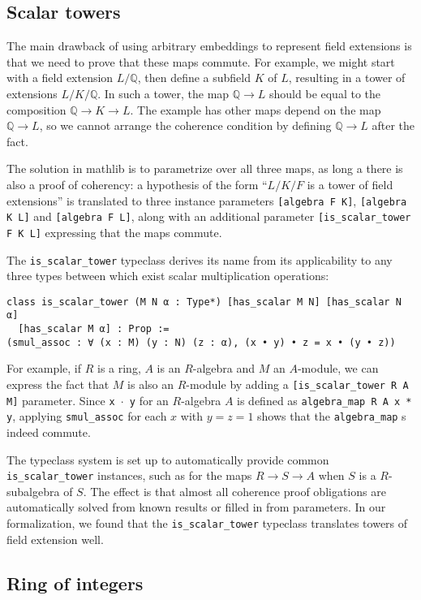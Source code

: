 \documentclass[a4paper,USenglish,cleveref, autoref, thm-restate]{lipics-v2021}
\newcommand{\lean}[1]{\texttt{#1}\xspace} %
\newcommand{\mathlib}{\textsf{mathlib}\xspace}
\newcommand{\Q}{\mathbb{Q}}
\begin{document}
\subsection{Scalar towers} \label{sec:scalar_tower}

The main drawback of using arbitrary embeddings to represent field extensions is that we need to prove that these maps commute.
For example, we might start with a field extension $L / \Q$, then define a subfield $K$ of $L$,
resulting in a tower of extensions $L / K / \Q$.
In such a tower, the map $\Q \to L$ should be equal to the composition $\Q \to K \to L$.
The example has other maps depend on the map $\Q \to L$, so we cannot arrange the coherence condition by defining $\Q \to L$ after the fact.

The solution in \mathlib is to parametrize over all three maps, as long a there is also a proof of coherency:
a hypothesis of the form ``$L / K / F$ is a tower of field extensions'' is translated to three instance parameters \lean{[algebra F K]}, \lean{[algebra K L]} and \lean{[algebra F L]},
along with an additional parameter \lean{[is\_scalar\_tower F K L]} expressing that the maps commute.

The \lean{is\_scalar\_tower} typeclass derives its name from its applicability to any three types between which exist scalar multiplication operations:
\begin{lstlisting}
class is_scalar_tower (M N α : Type*) [has_scalar M N] [has_scalar N α]
  [has_scalar M α] : Prop :=
(smul_assoc : ∀ (x : M) (y : N) (z : α), (x • y) • z = x • (y • z))
\end{lstlisting}
For example, if $R$ is a ring, $A$ is an $R$-algebra and $M$ an $A$-module, we can express the fact that $M$ is also an $R$-module by adding a \lean{[is\_scalar\_tower R A M]} parameter.
Since \lean{x $\cdot$ y} for an $R$-algebra $A$ is defined as \lean{algebra\_map R A x * y}, applying \lean{smul\_assoc} for each $x$ with $y = z = 1$ shows that the \lean{algebra\_map}s indeed commute.

The typeclass system is set up to automatically provide common \lean{is\_scalar\_tower} instances,
such as for the maps $R \to S \to A$ when $S$ is a $R$-subalgebra of $S$.
The effect is that almost all coherence proof obligations are automatically solved from known results or filled in from parameters.
In our formalization, we found that the \lean{is\_scalar\_tower} typeclass translates towers of field extension well.

\subsection{Ring of integers} \label{sec:ring-of-integers}
\end{document}
